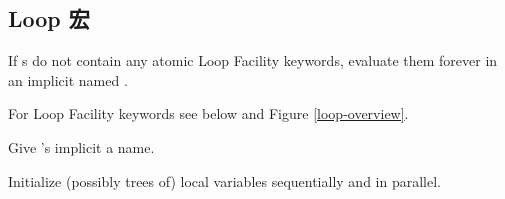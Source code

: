\subsection{Loop 宏}
\label{section:Loop 宏}

\begin{LIST}{1cm}

  {
     If s do not contain any atomic Loop
    Facility keywords, evaluate them forever in an implicit 
    named \NIL.
  }

  {
     For Loop Facility keywords
    see below and Figure \ref{loop-overview}.
  }

  \begin{LIST}{.5cm}
    
    {
      Give 's implicit  a name.
    }

    {
      Initialize (possibly trees of) local variables 
      sequentially and  in parallel. 
    }


\end{LIST}
\end{LIST}
